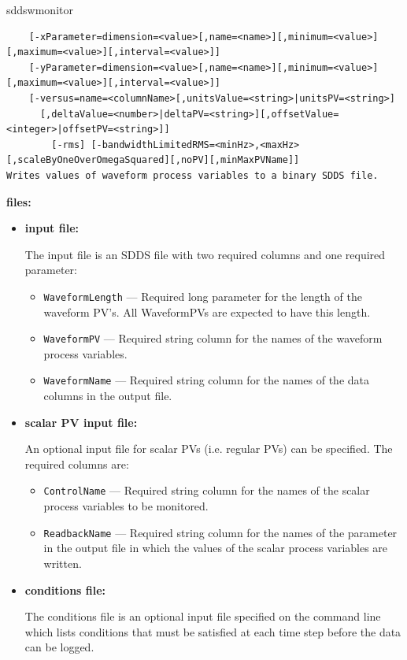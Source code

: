 \begin{sddsprog}{sddswmonitor}
\begin{verbatim}
    [-xParameter=dimension=<value>[,name=<name>][,minimum=<value>][,maximum=<value>][,interval=<value>]]
    [-yParameter=dimension=<value>[,name=<name>][,minimum=<value>][,maximum=<value>][,interval=<value>]]
    [-versus=name=<columnName>[,unitsValue=<string>|unitsPV=<string>]
      [,deltaValue=<number>|deltaPV=<string>][,offsetValue=<integer>|offsetPV=<string>]]
        [-rms] [-bandwidthLimitedRMS=<minHz>,<maxHz>[,scaleByOneOverOmegaSquared][,noPV][,minMaxPVName]]
Writes values of waveform process variables to a binary SDDS file.
\end{verbatim}
\item \textbf{files:}
\begin{itemize}
  \item \textbf{input file:}\par
The input file is an SDDS file with two required columns and one required parameter:
  \begin{itemize}
    \item {\verb+WaveformLength+} --- Required long parameter for the length of the waveform PV's. All
                WaveformPVs are expected to have this length.
    \item {\verb+WaveformPV+}  --- Required string column for the names of the waveform process variables.
    \item {\verb+WaveformName+} --- Required string column for the names of the data columns in the output file.
  \end{itemize}

  \item \textbf{scalar PV input file:}\par
An optional input file for scalar PVs (i.e. regular PVs) can be specified. The required columns are:
  \begin{itemize}
    \item {\tt ControlName} --- Required string column for the names of the scalar process variables
                to be monitored.
    \item {\tt ReadbackName} --- Required string column for the names of the parameter in the
                output file in which the values of the scalar process variables are written.
  \end{itemize}

  \item \textbf{conditions file:} \par
The conditions file is an optional input file specified on the command line which lists
conditions that must be satisfied at each time step before the data can be logged.


\end{itemize}
\end{sddsprog}
